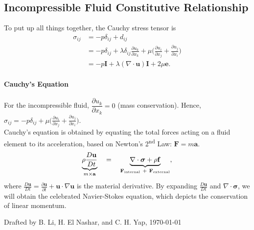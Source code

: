 \documentclass[a4paper]{article}
\begin{document}
\subsection{Incompressible Fluid Constitutive Relationship}
\vspace{-.2cm}
To put up all things together, the Cauchy stress tensor is
\begin{align*}
    \sigma_{ij} 
    & = -p\delta_{ij} + d_{ij} \\
    & = -p\delta_{ij} + \lambda \delta_{ij} \frac{\partial u_{k}}{\partial x_{k}}+ \mu \bigg(\frac{\partial u_{i}}{\partial x_{j}} + \frac{\partial u_{j}}{\partial x_{i}}\bigg) \\
    & = -p\mathbf{I} + \lambda (\nabla \cdot \mathbf{u})\mathbf{I} + 2\mu \mathbf{e}.
\end{align*}

\paragraph{Cauchy's Equation} For the incompressible fluid, $\dfrac{\partial u_k}{\partial x_k} = 0$ (mass conservation). Hence, $\displaystyle \sigma_{ij} = -p\delta_{ij} + \mu \bigg(\frac{\partial u_{i}}{\partial x_{j}} + \frac{\partial u_{j}}{\partial x_{i}}\bigg)$. \\

Cauchy's equation is obtained by equating the total forces acting on a fluid element to its acceleration, based on Newton's 2\textsuperscript{nd} Law: $\mathbf{F} = m \mathbf{a}$.
\[  
    \underbrace{\rho \frac{D\mathbf{u}}{D t} }_{m \times \mathbf{a}} 
    \quad = \quad
    \underbrace{\nabla \cdot \boldsymbol{\sigma} + \rho \mathbf{f}}_{\mathbf{F}_{\rm internal} \ + \ \mathbf{F}_{\rm external}}, 
\]
where $\displaystyle \frac{D\mathbf{u}}{D t} = \frac{\partial \mathbf{u}}{\partial t} + \mathbf{u} \cdot \nabla \mathbf{u}$ is the material derivative. By expanding  $\frac{D\mathbf{u}}{D t}$ and $\nabla \cdot \boldsymbol{\sigma}$, we will obtain the celebrated Navier-Stokes equation, which depicts the conservation of linear momentum.


\vfill
{\small \color{gray}Drafted by B. Li, H. El Nashar, and C. H. Yap,  \today}
% 
\end{document}
